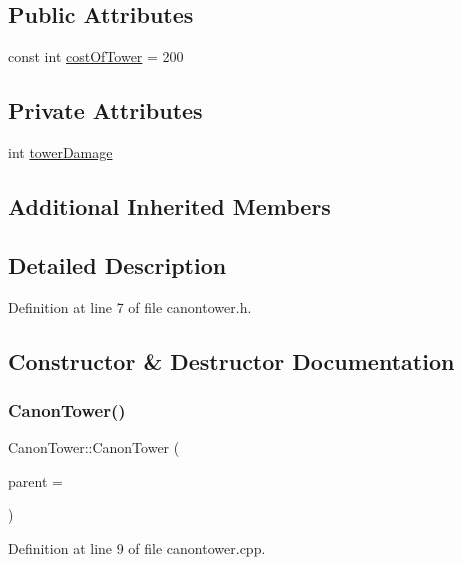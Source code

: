 \subsection*{Public Attributes}
\begin{DoxyCompactItemize}
\item 
const int \hyperlink{class_canon_tower_a545089ae31859c4bf0e46316c637383b}{cost\+Of\+Tower} = 200
\end{DoxyCompactItemize}
\subsection*{Private Attributes}
\begin{DoxyCompactItemize}
\item 
int \hyperlink{class_canon_tower_a26ea42f5a200246080dfba01340f057b}{tower\+Damage}
\end{DoxyCompactItemize}
\subsection*{Additional Inherited Members}


\subsection{Detailed Description}


Definition at line 7 of file canontower.\+h.



\subsection{Constructor \& Destructor Documentation}
\mbox{\label{class_canon_tower_a52a7edf2351dcf8646f25ff97c97cdf3}} 
\subsubsection{\texorpdfstring{Canon\+Tower()}{CanonTower()}}
{\footnotesize\ttfamily Canon\+Tower\+::\+Canon\+Tower (\begin{DoxyParamCaption}\item[{Q\+Graphics\+Item $\ast$}]{parent = {} }\end{DoxyParamCaption})}



Definition at line 9 of file canontower.\+cpp.


